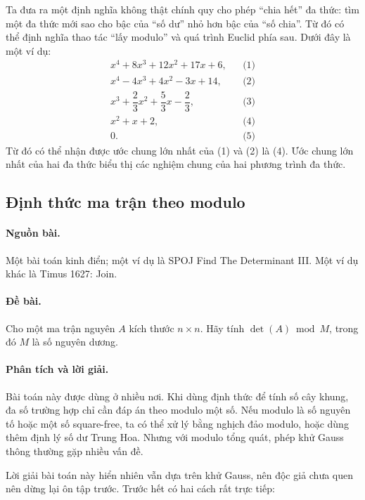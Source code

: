 \documentclass[11pt]{article}
\begin{document}
Ta đưa ra một định nghĩa không thật chính quy cho phép ``chia hết'' đa thức:
tìm một đa thức mới sao cho bậc của ``số dư'' nhỏ hơn bậc của ``số chia''. Từ
đó có thể định nghĩa thao tác ``lấy modulo'' và quá trình Euclid phía sau.
Dưới đây là một ví dụ:
\[
\begin{array}{rcl}
  x^4+8x^3+12x^2+17x+6, && \text{(1)}\\
  x^4-4x^3+4x^2-3x+14, && \text{(2)}\\
  x^3+\dfrac{2}{3}x^2+\dfrac{5}{3}x-\dfrac{2}{3}, && \text{(3)}\\
  x^2+x+2, && \text{(4)}\\
  0. && \text{(5)}
\end{array}
\]
Từ đó có thể nhận được ước chung lớn nhất của (1) và (2) là (4). Ước chung lớn
nhất của hai đa thức biểu thị các nghiệm chung của hai phương trình đa thức.

\subsection{Định thức ma trận theo modulo}

\paragraph{Nguồn bài.} Một bài toán kinh điển; một ví dụ là SPOJ Find The
Determinant III. Một ví dụ khác là Timus 1627: Join.

\paragraph{Đề bài.} Cho một ma trận nguyên $A$ kích thước $n\times n$. Hãy
tính $\det(A)\bmod M$, trong đó $M$ là số nguyên dương.

\paragraph{Phân tích và lời giải.}
Bài toán này được dùng ở nhiều nơi. Khi dùng định thức để tính số cây khung,
đa số trường hợp chỉ cần đáp án theo modulo một số. Nếu modulo là số nguyên tố
hoặc một số square-free, ta có thể xử lý bằng nghịch đảo modulo, hoặc dùng
thêm định lý số dư Trung Hoa. Nhưng với modulo tổng quát, phép khử Gauss thông
thường gặp nhiều vấn đề.

Lời giải bài toán này hiển nhiên vẫn dựa trên khử Gauss, nên độc giả chưa quen
nên dừng lại ôn tập trước. Trước hết có hai cách rất trực tiếp:
\end{document}
